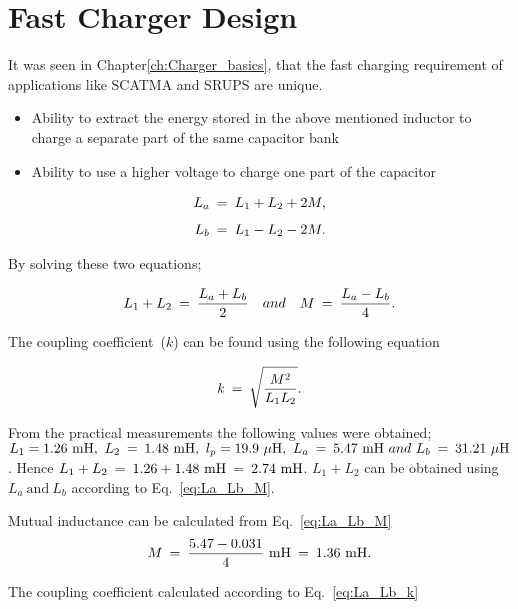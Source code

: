 \chapter{\textbf{Fast Charger Design}}
\label{ch:Charger_design}

It was seen in Chapter\ref{ch:Charger_basics}, that the fast charging requirement of applications like SCATMA and SRUPS are unique. 

\begin{itemize}
	\item Ability to extract the energy stored in the above mentioned inductor to charge a separate part of the same capacitor bank
	\item Ability to use a higher voltage to charge one part of the capacitor
\end{itemize}

\begin{align*}
L_a \:&=\: L_1 + L_2 + 2M,\\[1ex]
L_b \:&=\: L_1 - L_2 - 2M.
\end{align*}

By solving these two equations;

\begin{align}
\label{eq:La_Lb_M}
L_1 + L_2 \:=\: \frac{L_a +L_b}{2}~~~and~~~M\:=\:\frac{L_a - L_b}{4}.
\end{align}

The coupling coefficient~($k$) can be found using the following equation

\begin{align}
\label{eq:La_Lb_k}
k \:=\: \sqrt{\frac{M^2}{L_1L_2}}.
\end{align}

From the practical measurements the following values were obtained; $L_1=1.26~\text{mH},~ L_2\:=\:1.48~\text{mH},~l_p=19.9~\mu\text{H},~L_a\:=\:5.47~\text{mH}~and~L_b\:=\:31.21~\mu\text{H}$. Hence $L_1 + L_2\:=\:1.26 + 1.48~\text{mH}\:=\: 2.74~\text{mH}$. $L_1 + L_2$ can be obtained using $L_a ~\text{and}~ L_b$ according to Eq.~\ref{eq:La_Lb_M}. 

Mutual inductance can be calculated from Eq.~\ref{eq:La_Lb_M} 
\begin{align*}
M \:=\: \frac{5.47 - 0.031}{4}~\text{mH} \:=\: 1.36~\text{mH}.  
\end{align*}


The coupling coefficient calculated according to Eq.~\ref{eq:La_Lb_k}

